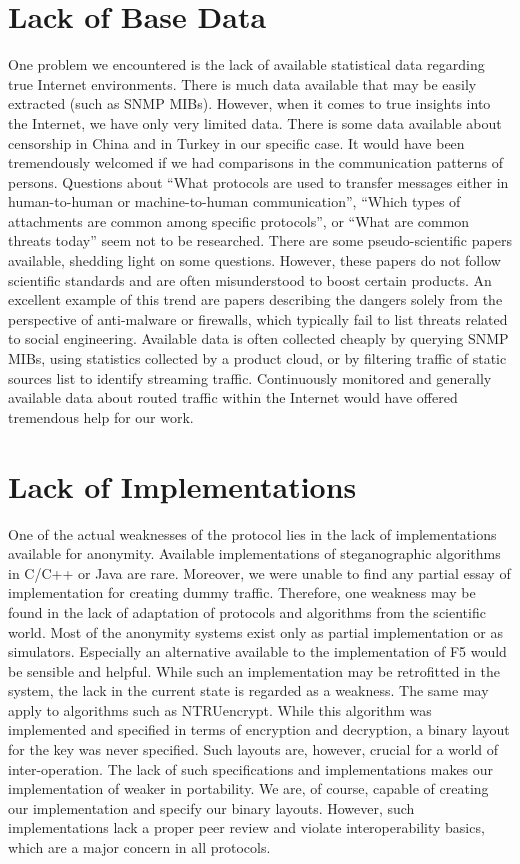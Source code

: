 \section{Lack of Base Data}

One problem we encountered is the lack of available statistical data regarding true Internet environments. There is much data available that may be easily extracted (such as SNMP MIBs). However, when it comes to true insights into the Internet, we have only very limited data. There is some data available about censorship in China and in Turkey in our specific case. It would have been tremendously welcomed if we had comparisons in the communication patterns of persons. Questions about ``What protocols are used to transfer messages either in human-to-human or machine-to-human communication'', ``Which types of attachments are common among specific protocols'', or ``What are common threats today'' seem not to be researched. There are some pseudo-scientific papers available, shedding light on some questions. However, these papers do not follow scientific standards and are often misunderstood to boost certain products. An excellent example of this trend are papers describing the dangers solely from the perspective of anti-malware or firewalls, which typically fail to list threats related to social engineering. Available data is often collected cheaply by querying SNMP MIBs, using statistics collected by a product cloud, or by filtering traffic of static sources list to identify streaming traffic. Continuously monitored and generally available data about routed traffic within the Internet would have offered tremendous help for our work.

\section{Lack of Implementations}
One of the actual weaknesses of the protocol lies in the lack of implementations available for anonymity. Available implementations of steganographic algorithms in C/C++ or Java are rare. Moreover, we were unable to find any partial essay of implementation for creating dummy traffic. Therefore, one weakness may be found in the lack of adaptation of protocols and algorithms from the scientific world. Most of the anonymity systems exist only as partial implementation or as simulators. Especially an alternative available to the implementation of F5 would be sensible and helpful. While such an implementation may be retrofitted in the system, the lack in the current state is regarded as a weakness. The same may apply to algorithms such as NTRUencrypt. While this algorithm was implemented and specified in terms of encryption and decryption, a binary layout for the key was never specified. Such layouts are, however, crucial for a world of inter-operation. The lack of such specifications and implementations makes our implementation of \MessageVortex{} weaker in portability. We are, of course, capable of creating our implementation and specify our binary layouts. However, such implementations lack a proper peer review and violate interoperability basics, which are a major concern in all protocols. 

